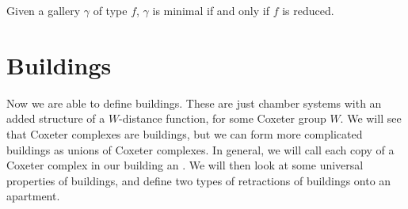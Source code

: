\documentclass[11pt]{article}
\begin{document}

\begin{theorem}
    Given a gallery $\gamma$ of type $f$, $\gamma$ is minimal if and only if $f$ is reduced.
\end{theorem}







\section{Buildings}\label{4}

Now we are able to define buildings. These are just chamber systems with an added structure of a $W$-distance function, for some Coxeter group $W$. We will see that Coxeter complexes are buildings, but we can form more complicated buildings as unions of Coxeter complexes. In general, we will call each copy of a Coxeter complex in our building an . We will then look at some universal properties of buildings, and define two types of retractions of buildings onto an apartment. 
\end{document}
